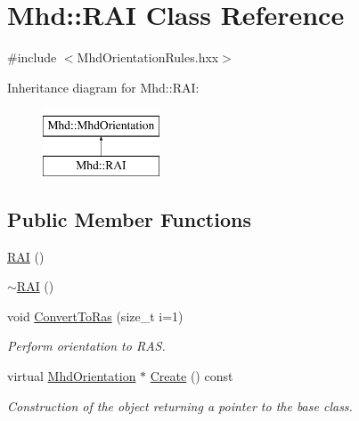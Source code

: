 \hypertarget{classMhd_1_1RAI}{\section{\-Mhd\-:\-:\-R\-A\-I \-Class \-Reference}
\label{classMhd_1_1RAI}
}


{\ttfamily \#include $<$\-Mhd\-Orientation\-Rules.\-hxx$>$}

\-Inheritance diagram for \-Mhd\-:\-:\-R\-A\-I\-:\begin{figure}[H]
\begin{center}
\leavevmode
\includegraphics[height=2.000000cm]{classMhd_1_1RAI}
\end{center}
\end{figure}
\subsection*{\-Public \-Member \-Functions}
\begin{DoxyCompactItemize}
\item 
\hyperlink{classMhd_1_1RAI_a4c7906f22a29e1f992cc70b30993b752}{\-R\-A\-I} ()
\item 
\hyperlink{classMhd_1_1RAI_a6aa9b99d888248449f75b24066e0f38f}{$\sim$\-R\-A\-I} ()
\item 
void \hyperlink{classMhd_1_1RAI_af8c1b663c43431b40431a001ec91acc1}{\-Convert\-To\-Ras} (size\-\_\-t i=1)
\begin{DoxyCompactList}\small\item\em \-Perform orientation to \-R\-A\-S. \end{DoxyCompactList}\item 
virtual \hyperlink{classMhd_1_1MhdOrientation}{\-Mhd\-Orientation} $\ast$ \hyperlink{classMhd_1_1RAI_aecb336828d73b837393091a98ba3f2dd}{\-Create} () const 
\begin{DoxyCompactList}\small\item\em \-Construction of the object returning a pointer to the base class. \end{DoxyCompactList}\end{DoxyCompactItemize}


